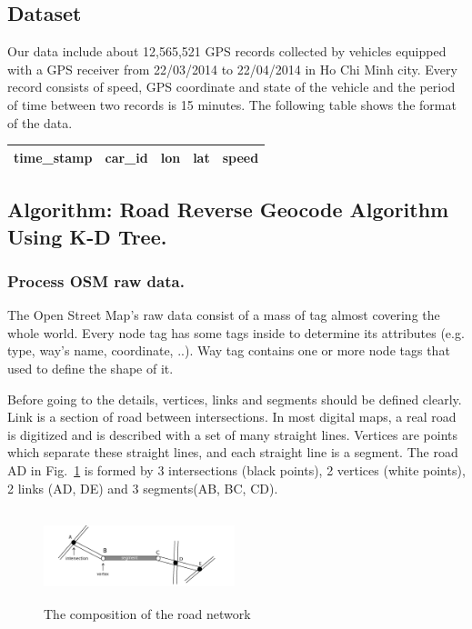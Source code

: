 \documentclass{acm_proc_article-sp}
\begin{document}
\subsection{Dataset}
Our data include about 12,565,521 GPS records collected by vehicles equipped with a GPS receiver from 22/03/2014 to 22/04/2014 in Ho Chi Minh city. Every record consists of speed, GPS coordinate and state of the vehicle and the period of time between two records is 15 minutes. The following table shows the format of the data.

\begin{table}[h]
\centering
\begin{tabular}{|c|c|c|c|c|}
\hline
\textbf{time\_stamp} & \textbf{car\_id} & \textbf{lon}   & \textbf{lat} & \textbf{speed} \\ \hline
\end{tabular}
\end{table}

\subsection{Algorithm: Road Reverse Geocode Algorithm Using K-D Tree.}	
	
\subsubsection{Process OSM raw data.}
	The Open Street Map's raw data consist of a mass of tag almost covering the whole world. Every node tag has some tags inside to determine its attributes (e.g. type, way's name, coordinate, ..). Way tag contains one or more node tags that used to define the shape of it.
	
		\setlength{\parindent}{0.7cm} Before going to the details, vertices, links and segments should be defined clearly. Link is a section of road between intersections. In most digital maps, a real road is digitized and is described with a set of many straight lines. Vertices are points which separate these straight lines, and each straight line is a segment. The road AD in Fig.~\ref{fig:composition} is formed by 3 intersections (black points), 2 vertices (white points), 2 links (AD, DE) and 3 segments(AB, BC, CD).
		
\begin{figure}[h]
\centering
\includegraphics[height=100px,width=210px]{figure1}
\caption{The composition of the road network}
\label{fig:composition}
\end{figure}
	
\end{document}
